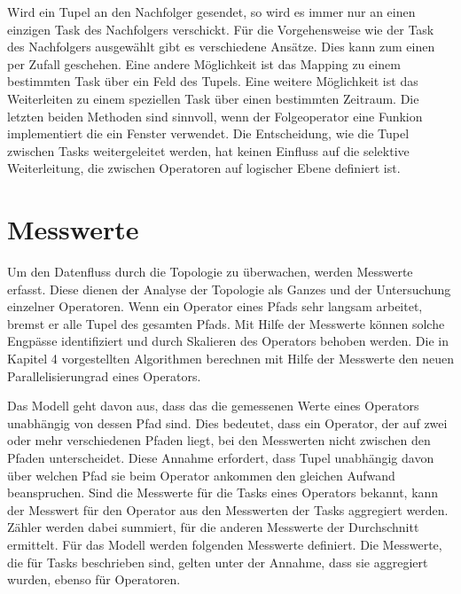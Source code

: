 Wird ein Tupel an den Nachfolger gesendet, so wird es immer nur an einen einzigen Task des Nachfolgers verschickt.
Für die Vorgehensweise wie der Task des Nachfolgers ausgewählt gibt es verschiedene Ansätze.
Dies kann zum einen per Zufall geschehen.
Eine andere Möglichkeit ist das Mapping zu einem bestimmten Task über ein Feld des Tupels.
Eine weitere Möglichkeit ist das Weiterleiten zu einem speziellen Task über einen bestimmten Zeitraum.
Die letzten beiden Methoden sind sinnvoll, wenn der Folgeoperator eine Funkion implementiert die ein Fenster verwendet.
Die Entscheidung, wie die Tupel zwischen Tasks weitergeleitet werden, hat keinen Einfluss auf die selektive Weiterleitung, die zwischen Operatoren auf logischer Ebene definiert ist.

\section{Messwerte}

Um den Datenfluss durch die Topologie zu überwachen, werden Messwerte erfasst.
Diese dienen der Analyse der Topologie als Ganzes und der Untersuchung einzelner Operatoren.
Wenn ein Operator eines Pfads sehr langsam arbeitet, bremst er alle Tupel des gesamten Pfads.
Mit Hilfe der Messwerte können solche Engpässe identifiziert und durch Skalieren des Operators behoben werden.
Die in Kapitel 4 vorgestellten Algorithmen berechnen mit Hilfe der Messwerte den neuen Parallelisierungrad eines Operators.

Das Modell geht davon aus, dass das die gemessenen Werte eines Operators unabhängig von dessen Pfad sind.
Dies bedeutet, dass ein Operator, der auf zwei oder mehr verschiedenen Pfaden liegt, bei den Messwerten nicht zwischen den Pfaden unterscheidet.
Diese Annahme erfordert, dass Tupel unabhängig davon über welchen Pfad sie beim Operator ankommen den gleichen Aufwand beanspruchen.
Sind die Messwerte für die Tasks eines Operators bekannt, kann der Messwert für den Operator aus den Messwerten der Tasks aggregiert werden.
Zähler werden dabei summiert, für die anderen Messwerte der Durchschnitt ermittelt.
Für das Modell werden folgenden Messwerte definiert.
Die Messwerte, die für Tasks beschrieben sind, gelten unter der Annahme, dass sie aggregiert wurden, ebenso für Operatoren.

